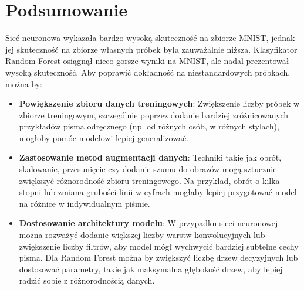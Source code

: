 \documentclass{article}
\begin{document}
\section{Podsumowanie}
Sieć neuronowa wykazała bardzo wysoką skuteczność na zbiorze MNIST, jednak jej skuteczność na zbiorze własnych próbek była zauważalnie niższa. Klasyfikator Random Forest osiągnął nieco gorsze wyniki na MNIST, ale nadal prezentował wysoką skuteczność. Aby poprawić dokładność na niestandardowych próbkach, można by:
\begin{itemize}
    \item \textbf{Powiększenie zbioru danych treningowych}: Zwiększenie liczby próbek w zbiorze treningowym, szczególnie poprzez dodanie bardziej zróżnicowanych przykładów pisma odręcznego (np. od różnych osób, w różnych stylach), mogłoby pomóc modelowi lepiej generalizować.
    \item \textbf{Zastosowanie metod augmentacji danych}: Techniki takie jak obrót, skalowanie, przesunięcie czy dodanie szumu do obrazów mogą sztucznie zwiększyć różnorodność zbioru treningowego. Na przykład, obrót o kilka stopni lub zmiana grubości linii w cyfrach mogłaby lepiej przygotować model na różnice w indywidualnym piśmie.
    \item \textbf{Dostosowanie architektury modelu}: W przypadku sieci neuronowej można rozważyć dodanie większej liczby warstw konwolucyjnych lub zwiększenie liczby filtrów, aby model mógł wychwycić bardziej subtelne cechy pisma. Dla Random Forest można by zwiększyć liczbę drzew decyzyjnych lub dostosować parametry, takie jak maksymalna głębokość drzew, aby lepiej radzić sobie z różnorodnością danych.
\end{itemize}
\end{document}
